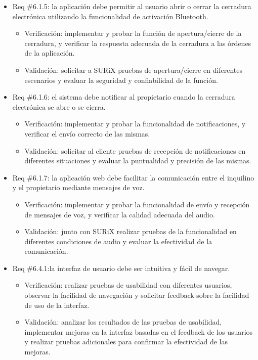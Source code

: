 \documentclass[
11pt, %
codirector, %
]{charter}
\begin{document}
\begin{itemize}
    \item Req \#6.1.5: la aplicación debe permitir al usuario abrir o cerrar la cerradura electrónica utilizando la funcionalidad de activación Bluetooth.
    \begin{itemize}
        \item Verificación: implementar y probar la función de apertura/cierre de la cerradura, y verificar la respuesta adecuada de la cerradura a las órdenes de la aplicación.
        \item Validación: solicitar a SURiX pruebas de apertura/cierre en diferentes escenarios y evaluar la seguridad y confiabilidad de la función.
    \end{itemize}

    \item Req \#6.1.6: el sistema debe notificar al propietario cuando la cerradura electrónica se abre o se cierra.
    \begin{itemize}
        \item Verificación: implementar y probar la funcionalidad de notificaciones, y verificar el envío correcto de las mismas.
        \item Validación: solicitar al cliente pruebas de recepción de notificaciones en diferentes situaciones y evaluar la puntualidad y precisión de las mismas.
    \end{itemize}

    \item Req \#6.1.7: la aplicación web debe facilitar la comunicación entre el inquilino y el propietario mediante mensajes de voz.
    \begin{itemize}
        \item Verificación: implementar y probar la funcionalidad de envío y recepción de mensajes de voz, y verificar la calidad adecuada del audio.
        \item Validación: junto con SURiX realizar pruebas de la funcionalidad en diferentes condiciones de audio y evaluar la efectividad de la comunicación.
    \end{itemize}

    \item Req \#6.4.1:la interfaz de usuario debe ser intuitiva y fácil de navegar.
   \begin{itemize}
            \item Verificación: realizar pruebas de usabilidad con diferentes usuarios, observar la facilidad de navegación y solicitar feedback sobre la facilidad de uso de la interfaz.
            \item Validación: analizar los resultados de las pruebas de usabilidad, implementar mejoras en la interfaz basadas en el feedback de los usuarios y realizar pruebas adicionales para confirmar la efectividad de las mejoras.
        \end{itemize}


\end{itemize}
\end{document}
